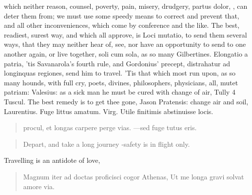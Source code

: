 which neither reason, counsel, poverty, pain, misery, drudgery, partus
dolor, \etc{}, can deter them from; we must use some speedy means to
correct and prevent that, and all other inconveniences, which come by
conference and the like. The best, readiest, surest way, and which all
approve, is Loci mutatio, to send them several ways, that they may
neither hear of, see, nor have an opportunity to send to one another
again, or live together, soli cum sola, as so many Gilbertines.
Elongatio a patria, 'tis Savanarola's fourth rule, and Gordonius'
precept, distrahatur ad longinquas regiones, send him to travel. 'Tis
that which most run upon, as so many hounds, with full cry, poets,
divines, philosophers, physicians, all, mutet patriam: Valesius:
as a sick man he must be cured with change of air, Tully 4
Tuscul. The best remedy is to get thee gone, Jason Pratensis: change
air and soil, Laurentius. Fuge littus amatum.
Virg. Utile finitimis abstinuisse locis.

\begin{latin}
\begin{verse}
procul, et longas carpere perge vias.
---sed fuge tutus eris.
\end{verse}
\end{latin}
\translationrule%
\begin{verse}%
Depart, and take a long journey
-safety is in flight only.
\end{verse}%

Travelling is an antidote of love,

\begin{latin}
\begin{verse}
Magnum iter ad doctas proficisci cogor Athenas,
Ut me longa gravi solvat amore via.
\end{verse}
\end{latin}

